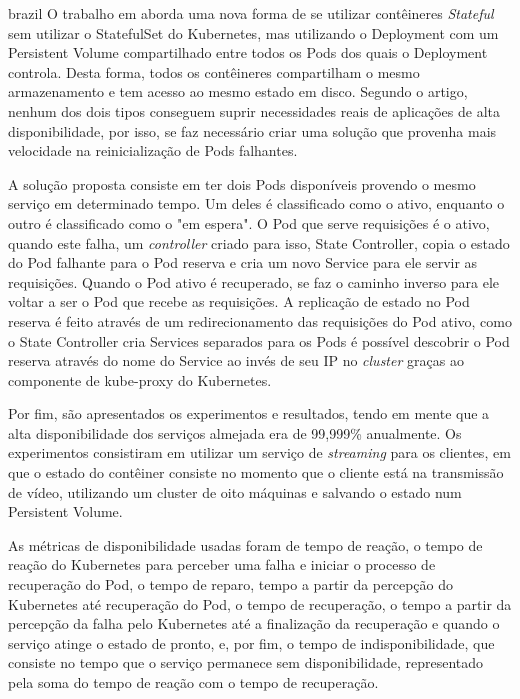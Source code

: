 \begin{otherlanguage*}{brazil}
O trabalho em \cite{vayghan2021kubernetes} aborda uma nova forma de se
utilizar contêineres \textit{Stateful} sem utilizar o StatefulSet do Kubernetes,
mas utilizando o Deployment com um Persistent Volume compartilhado entre todos
os Pods dos quais o Deployment controla. Desta forma, todos os contêineres
compartilham o mesmo armazenamento e tem acesso ao mesmo estado em disco.
Segundo o artigo, nenhum dos dois tipos conseguem suprir necessidades reais de
aplicações de alta disponibilidade, por isso, se faz necessário criar uma
solução que provenha mais velocidade na reinicialização de Pods falhantes.

A solução proposta consiste em ter dois Pods disponíveis provendo o mesmo
serviço em determinado tempo. Um deles é classificado como o ativo, enquanto
o outro é classificado como o "em espera". O Pod que serve requisições é o
ativo, quando este falha, um \textit{controller} criado para isso, State Controller,
copia o estado do Pod falhante para o Pod reserva e cria um novo Service para ele
servir as requisições. Quando o Pod ativo é recuperado, se faz o caminho inverso
para ele voltar a ser o Pod que recebe as requisições. A replicação de estado no
Pod reserva é feito através de um redirecionamento das requisições do Pod ativo,
como o State Controller cria Services separados para os Pods é possível descobrir
o Pod reserva através do nome do Service ao invés de seu IP no \textit{cluster}
graças ao componente de kube-proxy do Kubernetes.

Por fim, são apresentados os experimentos e resultados, tendo em mente que a
alta disponibilidade dos serviços almejada era de 99,999\% anualmente. Os
experimentos consistiram em utilizar um serviço de \textit{streaming} para os
clientes, em que o estado do contêiner consiste no momento que o cliente está
na transmissão de vídeo, utilizando um cluster de oito máquinas e salvando o
estado num Persistent Volume.

As métricas de disponibilidade usadas foram de tempo de reação, o tempo de
reação do Kubernetes para perceber uma falha e iniciar o processo de
recuperação do Pod, o tempo de reparo, tempo a partir da percepção do Kubernetes
até recuperação do Pod, o tempo de recuperação, o tempo a partir da percepção
da falha pelo Kubernetes até a finalização da recuperação e quando o serviço
atinge o estado de pronto, e, por fim, o tempo de indisponibilidade, que
consiste no tempo que o serviço permanece sem disponibilidade, representado
pela soma do tempo de reação com o tempo de recuperação.


\end{otherlanguage*}
